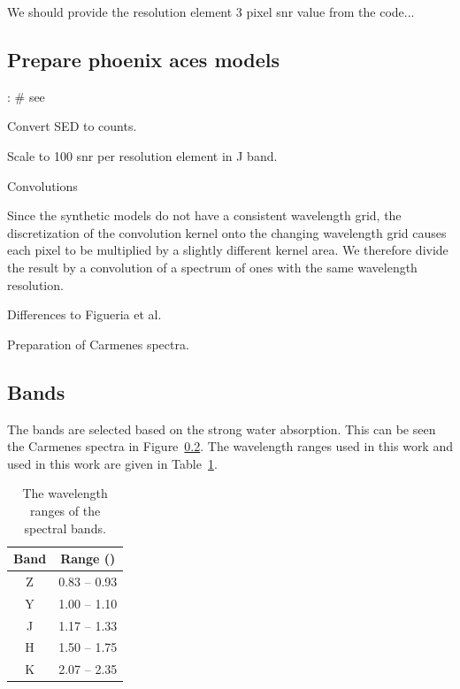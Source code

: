 We should provide the resolution element 3 pixel snr value from the code...


\subsection{Prepare phoenix aces models}:
\# see~\citet{figueira_radial_2016}

Convert SED to counts.


Scale to 100 snr per resolution element in J band.

Convolutions


Since the synthetic models do not have a consistent wavelength grid, the discretization of the convolution kernel onto the  changing wavelength grid causes each pixel to be multiplied by  a slightly different kernel area. We therefore divide the result by a convolution of a spectrum of ones with the same wavelength resolution.

Differences to Figueria et al.


Preparation of Carmenes spectra.



\subsection{Bands}
The bands are selected based on the strong water absorption. This can be seen the Carmenes spectra in Figure~\ref{}. The wavelength ranges used in this work \citet{figueira_radial_2016} and used in this work are given in Table~\ref{tab:band_ranges}. 
\begin{table}
    \centering
    \caption{The wavelength ranges of the \nir{} spectral bands.}
    \begin{tabular}{cc}
        \toprule
        Band & Range (\um{})\\
        \midrule
        Z & 0.83 -- 0.93\\
        Y & 1.00 -- 1.10\\
        J & 1.17 -- 1.33\\
        H & 1.50 -- 1.75\\
        K & 2.07 -- 2.35\\
        \bottomrule
    \end{tabular}
    \label{tab:band_ranges}
\end{table}




